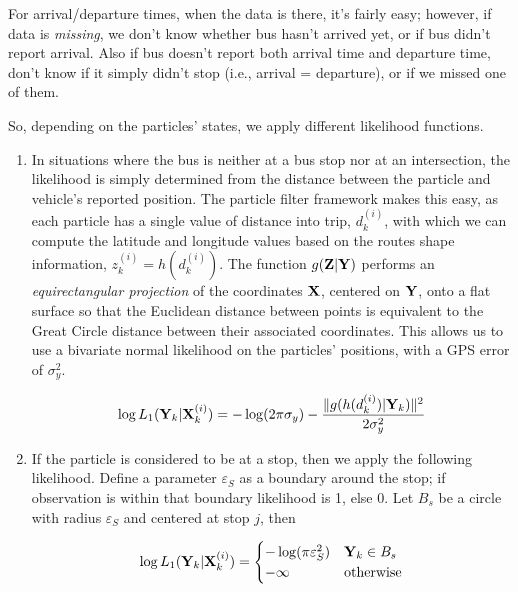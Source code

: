 \documentclass[draftcls,a4paper,onecolumn]{IEEEtran}\usepackage[]{graphicx}\usepackage[]{color}
\begin{document}
For arrival/departure times, when the data is there, it's fairly easy;
however, if data is \emph{missing}, we don't know whether bus hasn't arrived yet,
or if bus didn't report arrival.
Also if bus doesn't report both arrival time and departure time,
don't know if it simply didn't stop (i.e., arrival = departure),
or if we missed one of them.

So, depending on the particles' states, we apply different likelihood functions.

\begin{enumerate}
\item
In situations where the bus is neither at a bus stop nor at an intersection,
the likelihood is simply determined from the distance between the particle and 
vehicle's reported position.
The particle filter framework makes this easy,
as each particle has a single value of distance into trip, $d_k^{(i)}$,
with which we can compute the latitude and longitude values based on 
the routes shape information, $z_k^{(i)} = h(d_k^{(i)})$.
The function $g (\mathbf{Z} | \mathbf{Y})$ performs an \emph{equirectangular projection} \cite{Snyder1997}
of the coordinates $\mathbf{X}$, centered on $\mathbf{Y}$, 
onto a flat surface so that the Euclidean distance between points is equivalent
to the Great Circle distance between their associated coordinates.
This allows us to use a bivariate normal likelihood on the particles' positions,
with a GPS error of $\sigma_y^2$.

\begin{equation}
  \label{eq:l1}
  \log L_1 (\mathbf{Y}_k | \mathbf{X}_k^{(i)}) = - \log(2\pi\sigma_y) - \frac{\|g(h(d_k^{(i)})|\mathbf{Y}_k)\|^2}{2\sigma_y^2}
\end{equation}


\item
If the particle is considered to be at a stop, then we apply the following likelihood.
Define a parameter $\varepsilon_S$ as a boundary around the stop;
if observation is within that boundary likelihood is 1, else 0.
Let $B_s$ be a circle with radius $\varepsilon_S$ and centered at stop $j$, then

\begin{equation}
  \label{eq:l1b}
  \log L_1(\mathbf{Y}_k | \mathbf{X}_k^{(i)})=
  \begin{cases}
    - \log(\pi \varepsilon_S^2) & \mathbf{Y}_k \in B_s \\
    - \infty & \text{otherwise}
  \end{cases}
\end{equation}


\end{enumerate}
\end{document}
